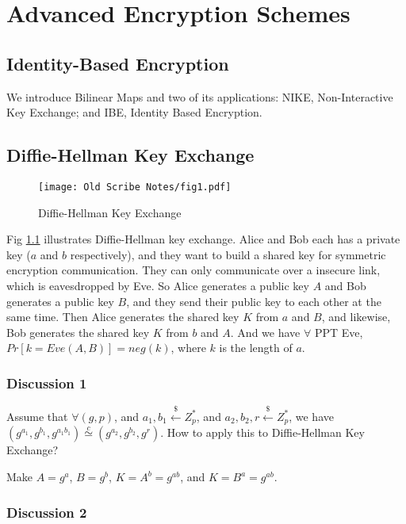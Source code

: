\chapter{Advanced Encryption Schemes}
\section{Identity-Based Encryption}

We introduce Bilinear Maps and two of its applications: NIKE, Non-Interactive Key Exchange; and IBE, Identity Based Encryption.


\section{Diffie-Hellman Key Exchange}

\begin{figure}
\label{fig:dh}
\centering
  \texttt{[image: Old Scribe Notes/fig1.pdf]}
\caption{Diffie-Hellman Key Exchange}
\end{figure}


Fig \ref{fig:dh} illustrates Diffie-Hellman key exchange. Alice and Bob each has a private key ($a$ and $b$ respectively), and they want to build a shared key for symmetric encryption communication. They can only communicate over a insecure link, which is eavesdropped by Eve.
So Alice generates a public key $A$ and Bob generates a public key $B$, and they send their public key to each other at the same time. Then Alice generates the shared key $K$ from $a$ and $B$, and likewise, Bob generates the shared key $K$ from $b$ and $A$.
And we have $\forall$ PPT Eve, $Pr[k=Eve(A,B)]=neg(k)$, where $k$ is the length of $a$.


\subsection{Discussion 1}

Assume that $\forall (g, p)$, and $a_1,b_1 \stackrel{\$}{\gets} Z^*_p$, and $a_2,b_2,r \stackrel{\$}{\gets}Z^*_p$, we have $(g^{a_1}, g^{b_1}, g^{a_1b_1}) \stackrel{c}{\simeq} (g^{a_2}, g^{b_2}, g^r)$. How to apply this to Diffie-Hellman Key Exchange?


Make $A=g^a$, $B=g^b$, $K=A^b=g^{ab}$, and $K=B^a=g^{ab}$.


\subsection{Discussion 2}


